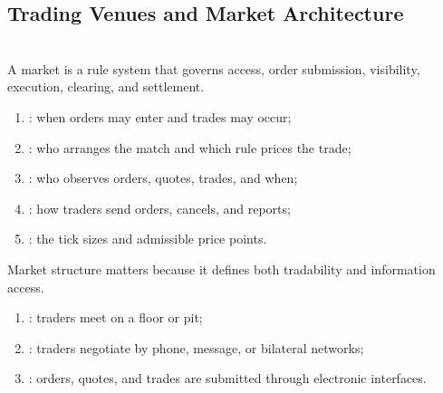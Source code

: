 \subsection{Trading Venues and Market Architecture}

\begin{principle} \\
A market is a rule system that governs access, order submission, visibility, execution, clearing, and settlement.
\end{principle}

\begin{taxonomy} 
\begin{enumerate}[label=\roman*.]
\setlength{\itemsep}{0pt}
\item {}: when orders may enter and trades may occur;
\item {}: who arranges the match and which rule prices the trade;
\item {}: who observes orders, quotes, trades, and when;
\item {}: how traders send orders, cancels, and reports;
\item {}: the tick sizes and admissible price points.
\end{enumerate}
Market structure matters because it defines both tradability and information access.
\end{taxonomy}

\begin{taxonomy} 
\begin{enumerate}[label=\roman*.]
\setlength{\itemsep}{0pt}
\item {}: traders meet on a floor or pit;
\item {}: traders negotiate by phone, message, or bilateral networks;
\item {}: orders, quotes, and trades are submitted through electronic interfaces.
\end{enumerate}
\end{taxonomy}

